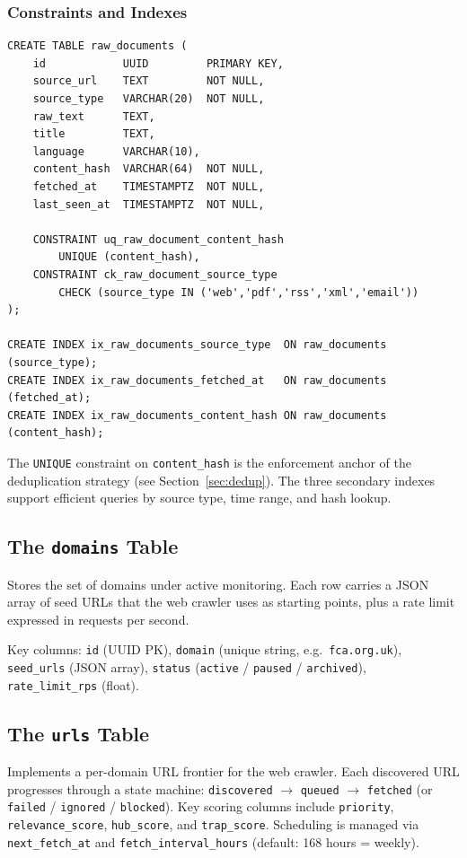 \documentclass[12pt,a4paper]{article}
\begin{document}
\subsubsection{Constraints and Indexes}

\begin{lstlisting}[style=sqlstyle, caption={raw\_documents DDL (from Alembic migration 002)}]
CREATE TABLE raw_documents (
    id            UUID         PRIMARY KEY,
    source_url    TEXT         NOT NULL,
    source_type   VARCHAR(20)  NOT NULL,
    raw_text      TEXT,
    title         TEXT,
    language      VARCHAR(10),
    content_hash  VARCHAR(64)  NOT NULL,
    fetched_at    TIMESTAMPTZ  NOT NULL,
    last_seen_at  TIMESTAMPTZ  NOT NULL,

    CONSTRAINT uq_raw_document_content_hash
        UNIQUE (content_hash),
    CONSTRAINT ck_raw_document_source_type
        CHECK (source_type IN ('web','pdf','rss','xml','email'))
);

CREATE INDEX ix_raw_documents_source_type  ON raw_documents (source_type);
CREATE INDEX ix_raw_documents_fetched_at   ON raw_documents (fetched_at);
CREATE INDEX ix_raw_documents_content_hash ON raw_documents (content_hash);
\end{lstlisting}

The \texttt{UNIQUE} constraint on \texttt{content\_hash} is the enforcement anchor of the deduplication strategy (see Section~\ref{sec:dedup}). The three secondary indexes support efficient queries by source type, time range, and hash lookup.

\subsection{The \texttt{domains} Table}

Stores the set of domains under active monitoring. Each row carries a JSON array of seed URLs that the web crawler uses as starting points, plus a rate limit expressed in requests per second.

Key columns: \texttt{id} (UUID PK), \texttt{domain} (unique string, e.g.\ \texttt{fca.org.uk}), \texttt{seed\_urls} (JSON array), \texttt{status} (\texttt{active} / \texttt{paused} / \texttt{archived}), \texttt{rate\_limit\_rps} (float).

\subsection{The \texttt{urls} Table}

Implements a per-domain URL frontier for the web crawler. Each discovered URL progresses through a state machine: \texttt{discovered} $\to$ \texttt{queued} $\to$ \texttt{fetched} (or \texttt{failed} / \texttt{ignored} / \texttt{blocked}). Key scoring columns include \texttt{priority}, \texttt{relevance\_score}, \texttt{hub\_score}, and \texttt{trap\_score}. Scheduling is managed via \texttt{next\_fetch\_at} and \texttt{fetch\_interval\_hours} (default: 168 hours = weekly).
\end{document}

